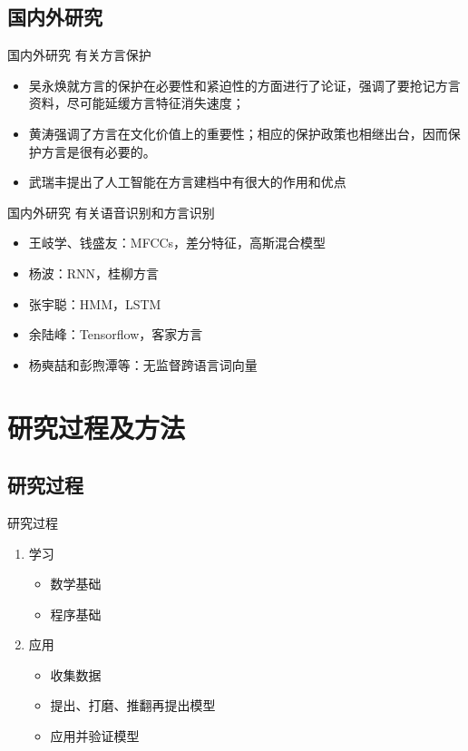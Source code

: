 \documentclass[10pt]{beamer}
\begin{document}
\subsection{国内外研究} 
\begin{frame}{国内外研究}
    有关方言保护
    \begin{itemize}
        \item 吴永焕\cite{WuYonghuan}就方言的保护在必要性和紧迫性的方面进行了论证，强调了要抢记方言资料，尽可能延缓方言特征消失速度；
        \item 黄涛\cite{Huangtao}强调了方言在文化价值上的重要性；相应的保护政策也相继出台，因而保护方言是很有必要的。
        \item 武瑞丰\cite{WuRuiFeng}提出了人工智能在方言建档中有很大的作用和优点
    \end{itemize}
\end{frame}
\begin{frame}{国内外研究}
    有关语音识别和方言识别
    \begin{itemize}
        \item 王岐学、钱盛友\cite{WangQiXue}：MFCCs，差分特征，高斯混合模型
        \item 杨波\cite{YangBo2019}：RNN，桂柳方言
        \item 张宇聪\cite{ZhangYuCong2016}：HMM，LSTM
        \item 余陆峰\cite{YuLuFeng2019}：Tensorflow，客家方言
        \item 杨奭喆\cite{YangShiZhe2020}和彭煦潭等\cite{peng2020}：无监督跨语言词向量
    \end{itemize}
\end{frame}
\section{研究过程及方法}
\subsection{研究过程}
\begin{frame}{研究过程}
    \begin{enumerate}
        \item 学习
        \begin{itemize}
            \item 数学基础
            \item 程序基础
        \end{itemize}
        \item 应用
        \begin{itemize}
            \item 收集数据
            \item 提出、打磨、推翻再提出模型
            \item 应用并验证模型
        \end{itemize}
    \end{enumerate}
\end{frame}
\end{document}
